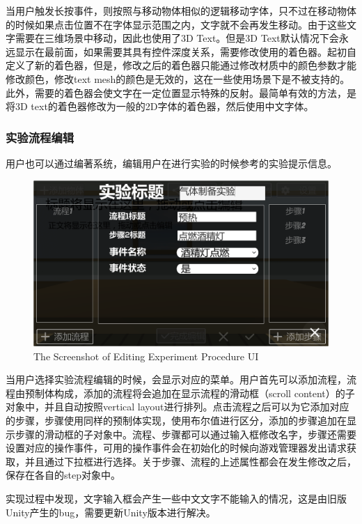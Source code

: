 当用户触发长按事件，则按照与移动物体相似的逻辑移动字体，只不过在移动物体的时候如果点击位置不在字体显示范围之内，文字就不会再发生移动。由于这些文字需要在三维场景中移动，因此也使用了3D Text。但是3D Text默认情况下会永远显示在最前面，如果需要其具有控件深度关系，需要修改使用的着色器。起初自定义了新的着色器，但是，修改之后的着色器只能通过修改材质中的颜色参数才能修改颜色，修改text mesh的颜色是无效的，这在一些使用场景下是不被支持的。此外，需要的着色器会使文字在一定位置显示特殊的反射。最简单有效的方法，是将3D text的着色器修改为一般的2D字体的着色器，然后使用中文字体。

\subsubsection{实验流程编辑}
用户也可以通过编著系统，编辑用户在进行实验的时候参考的实验提示信息。

\begin{figure}[!htp]
  \centering
  \includegraphics[width=12cm]{figure/step.png}
    {The Screenshot of Editing Experiment Procedure UI}
 \label{fig:gm}
\end{figure}

当用户选择实验流程编辑的时候，会显示对应的菜单。用户首先可以添加流程，流程由预制体构成，添加的流程将会追加在显示流程的滑动框（scroll content）的子对象中，并且自动按照vertical layout进行排列。点击流程之后可以为它添加对应的步骤，步骤使用同样的预制体实现，使用布尔值进行区分，添加的步骤追加在显示步骤的滑动框的子对象中。流程、步骤都可以通过输入框修改名字，步骤还需要设置对应的操作事件，可用的操作事件会在初始化的时候向游戏管理器发出请求获取，并且通过下拉框进行选择。关于步骤、流程的上述属性都会在发生修改之后，保存在各自的step对象中。

实现过程中发现，文字输入框会产生一些中文文字不能输入的情况，这是由旧版Unity产生的bug，需要更新Unity版本进行解决。

